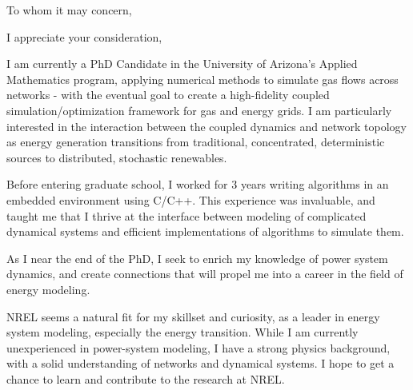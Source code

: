 \documentclass[11pt,a4paper,sans]{moderncv}        %
\begin{document}
\date{\today}
\opening{To whom it may concern,}
\closing{I appreciate your consideration,}
\makelettertitle

I am currently a PhD Candidate in the University of Arizona's Applied Mathematics program, applying numerical methods to simulate gas flows across networks - with the eventual goal to create a high-fidelity coupled simulation/optimization framework for gas and energy grids. I am particularly interested in the interaction between the coupled dynamics and network topology as energy generation transitions from traditional, concentrated, deterministic sources to distributed, stochastic renewables.

Before entering graduate school, I worked for 3 years writing algorithms in an embedded environment using C/C++. This experience was invaluable, and taught me that I thrive at the interface between modeling of complicated dynamical systems and efficient implementations of algorithms to simulate them.

As I near the end of the PhD, I seek to enrich my knowledge of power system dynamics, and create connections that will propel me into a career in the field of energy modeling.

NREL seems a natural fit for my skillset and curiosity, as a leader in energy system modeling, especially the energy transition. While I am currently unexperienced in power-system modeling, I have a strong physics background, with a solid understanding of networks and dynamical systems. I hope to get a chance to learn and contribute to the research at NREL.

\vspace{1in}
\makeletterclosing
\end{document}
